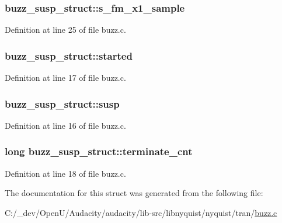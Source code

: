 \subsubsection[{\texorpdfstring{s\+\_\+fm\+\_\+x1\+\_\+sample}{s_fm_x1_sample}}]{ buzz\+\_\+susp\+\_\+struct\+::s\+\_\+fm\+\_\+x1\+\_\+sample}\hypertarget{structbuzz__susp__struct_a49a6b980304e61dd434ff7f409ceb064}{}\label{structbuzz__susp__struct_a49a6b980304e61dd434ff7f409ceb064}


Definition at line 25 of file buzz.\+c.

\subsubsection[{\texorpdfstring{started}{started}}]{ buzz\+\_\+susp\+\_\+struct\+::started}\hypertarget{structbuzz__susp__struct_afded2dfa5645dfdbedf9cc900d58b519}{}\label{structbuzz__susp__struct_afded2dfa5645dfdbedf9cc900d58b519}


Definition at line 17 of file buzz.\+c.

\subsubsection[{\texorpdfstring{susp}{susp}}]{ buzz\+\_\+susp\+\_\+struct\+::susp}\hypertarget{structbuzz__susp__struct_afdb0128a3eb30e08e1e472b8b4767659}{}\label{structbuzz__susp__struct_afdb0128a3eb30e08e1e472b8b4767659}


Definition at line 16 of file buzz.\+c.

\subsubsection[{\texorpdfstring{terminate\+\_\+cnt}{terminate_cnt}}]{\setlength{\rightskip}{0pt plus 5cm}long buzz\+\_\+susp\+\_\+struct\+::terminate\+\_\+cnt}\hypertarget{structbuzz__susp__struct_a40e3db4633d25ee19ebfd13a04af091f}{}\label{structbuzz__susp__struct_a40e3db4633d25ee19ebfd13a04af091f}


Definition at line 18 of file buzz.\+c.



The documentation for this struct was generated from the following file\+:\begin{DoxyCompactItemize}
\item 
C\+:/\+\_\+dev/\+Open\+U/\+Audacity/audacity/lib-\/src/libnyquist/nyquist/tran/\hyperlink{buzz_8c}{buzz.\+c}\end{DoxyCompactItemize}
